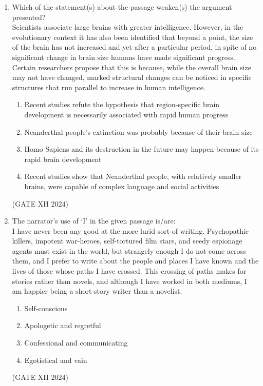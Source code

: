 \documentclass{article}
\begin{document}
\begin{enumerate}
    \item Which of the statement(s) about the passage weaken(s) the argument presented? \\
    Scientists associate large brains with greater intelligence. However, in the evolutionary context it has also been identified that beyond a point, the size of the brain has not increased and yet after a particular period, in spite of no significant change in brain size humans have made significant progress. Certain researchers propose that this is because, while the overall brain size may not have changed, marked structural changes can be noticed in specific structures that run parallel to increase in human intelligence.
    
    \begin{enumerate}
        \item Recent studies refute the hypothesis that region-specific brain development is necessarily associated with rapid human progress
        \item Neanderthal people’s extinction was probably because of their brain size
        \item Homo Sapiens and its destruction in the future may happen because of its rapid brain development
        \item Recent studies show that Neanderthal people, with relatively smaller brains, were capable of complex language and social activities
    \end{enumerate} \hfill (GATE XH 2024)

    \item The narrator’s use of ‘I’ in the given passage is/are: \\
    I have never been any good at the more lurid sort of writing. Psychopathic killers, impotent war-heroes, self-tortured film stars, and seedy espionage agents must exist in the world, but strangely enough I do not come across them, and I prefer to write about the people and places I have known and the lives of those whose paths I have crossed. This crossing of paths makes for stories rather than novels, and although I have worked in both mediums, I am happier being a short-story writer than a novelist.

    \begin{multicols}{2}
        \begin{enumerate}
            \item Self-conscious
            \item Apologetic and regretful
            \item Confessional and communicating
            \item Egotistical and vain
        \end{enumerate}
    \end{multicols} \hfill (GATE XH 2024)
    

\end{enumerate}
\end{document}
